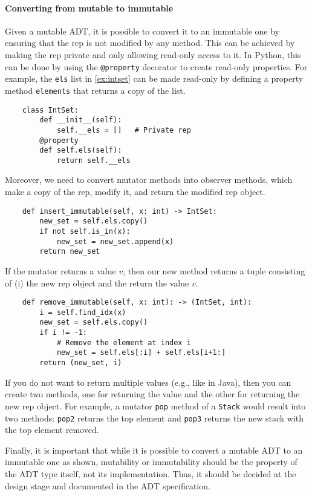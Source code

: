 \documentclass[oneside,11pt,dvipsnames]{book}
\newcommand{\code}[1]{\texttt{#1}}
\begin{document}
\paragraph{Converting from mutable to immutable} 
Given a mutable ADT, it is possible to convert it to an immutable one by ensuring that the rep is not modified by any method. This can be achieved by making the rep private and only allowing read-only access to it. In Python, this can be done by using the \code{@property} decorator to create read-only properties. For example, the \code{els} list in \autoref{ex:intset} can be made read-only by defining a property method \code{elements} that returns a copy of the list.

\begin{lstlisting}
    class IntSet:
        def __init__(self):
            self.__els = []   # Private rep
        @property
        def self.els(self):
            return self.__els
\end{lstlisting}

Moreover, we need to convert mutator methods into observer methods, which make a copy of the rep, modify it, and return the modified rep object.  
\begin{lstlisting}
    def insert_immutable(self, x: int) -> IntSet:
        new_set = self.els.copy()
        if not self.is_in(x):
            new_set = new_set.append(x)
        return new_set
\end{lstlisting}

If the mutator returns a value $v$, then our new method returns a tuple consisting of (i) the new rep object and the return the value $v$. 
\begin{lstlisting}
    def remove_immutable(self, x: int): -> (IntSet, int):
        i = self.find_idx(x)
        new_set = self.els.copy()
        if i != -1:
            # Remove the element at index i
            new_set = self.els[:i] + self.els[i+1:]  
        return (new_set, i)
\end{lstlisting}

If you do not want to return multiple values (e.g., like in Java), then you can create two methods, one for returning the value and the other for returning the new rep object.
For example, a mutator \code{pop} method of a \code{Stack} would result into two methods: \code{pop2} returns the top element and \code{pop3} returns the new stack with the top element removed.

Finally, it is important that while it is possible to convert a mutable ADT to an immutable one as shown, mutability or immutability should be the property of the ADT type itself, not its implementation. Thus, it should be decided at the design stage and documented in the ADT specification.
\end{document}
